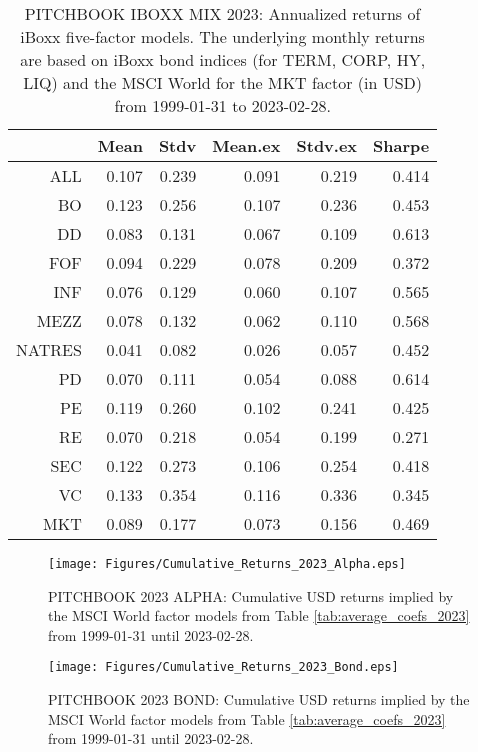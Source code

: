 \begin{table}[ht]
	\centering
	\begin{tabular}{rrrrrr}
		& Mean & Stdv & Mean.ex & Stdv.ex & Sharpe \\ 
		\hline
		\hline
		ALL & 0.107 & 0.239 & 0.091 & 0.219 & 0.414 \\ 
		BO & 0.123 & 0.256 & 0.107 & 0.236 & 0.453 \\ 
		DD & 0.083 & 0.131 & 0.067 & 0.109 & 0.613 \\ 
		FOF & 0.094 & 0.229 & 0.078 & 0.209 & 0.372 \\ 
		INF & 0.076 & 0.129 & 0.060 & 0.107 & 0.565 \\ 
		MEZZ & 0.078 & 0.132 & 0.062 & 0.110 & 0.568 \\ 
		NATRES & 0.041 & 0.082 & 0.026 & 0.057 & 0.452 \\ 
		PD & 0.070 & 0.111 & 0.054 & 0.088 & 0.614 \\ 
		PE & 0.119 & 0.260 & 0.102 & 0.241 & 0.425 \\ 
		RE & 0.070 & 0.218 & 0.054 & 0.199 & 0.271 \\ 
		SEC & 0.122 & 0.273 & 0.106 & 0.254 & 0.418 \\ 
		VC & 0.133 & 0.354 & 0.116 & 0.336 & 0.345 \\ 
		\hline
		MKT & 0.089 & 0.177 & 0.073 & 0.156 & 0.469 \\ 
		\hline
		\hline
	\end{tabular}
	\caption{
		PITCHBOOK IBOXX MIX 2023:
		Annualized returns of iBoxx five-factor models.
		The underlying monthly returns are based on iBoxx bond indices (for TERM, CORP, HY, LIQ) and the MSCI World for the MKT factor (in USD) from 1999-01-31 to 2023-02-28.
	} 
	\label{tab:ann_returns_iboxx}
\end{table}
\fi

\clearpage


\begin{figure}[H]
	\centering
	\texttt{[image: Figures/Cumulative\_Returns\_2023\_Alpha.eps]}
	\caption{PITCHBOOK 2023 ALPHA: Cumulative USD returns implied by the MSCI World factor models from Table \ref{tab:average_coefs_2023} from 1999-01-31 until 2023-02-28.}
	\label{fig:cum_returns_2023_alpha}   
\end{figure}


\begin{figure}[H]
	\centering
	\texttt{[image: Figures/Cumulative\_Returns\_2023\_Bond.eps]}
	\caption{PITCHBOOK 2023 BOND: Cumulative USD returns implied by the MSCI World factor models from Table \ref{tab:average_coefs_2023} from 1999-01-31 until 2023-02-28.}
	\label{fig:cum_returns_2023_iboxxx}
\end{figure}
